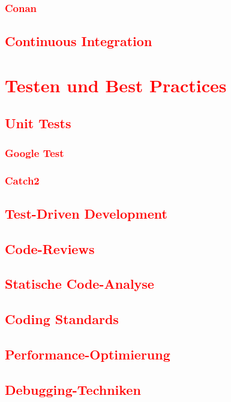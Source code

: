 \subsection{\textcolor{red}{Conan}}\label{sec:conan}
\section{\textcolor{red}{Continuous Integration}}\label{sec:continuous-integration}

\cleardoublepage\chapter{\textcolor{red}{Testen und Best Practices}}\label{chap:testing}
\section{\textcolor{red}{Unit Tests}}\label{sec:unit-tests}
\subsection{\textcolor{red}{Google Test}}\label{sec:google-test}
\subsection{\textcolor{red}{Catch2}}\label{sec:catch2}
\section{\textcolor{red}{Test-Driven Development}}\label{sec:tdd}
\section{\textcolor{red}{Code-Reviews}}\label{sec:code-reviews}
\section{\textcolor{red}{Statische Code-Analyse}}\label{sec:static-code-analysis}
\section{\textcolor{red}{Coding Standards}}\label{sec:coding-standards}
\section{\textcolor{red}{Performance-Optimierung}}\label{sec:performance-optimization}
\section{\textcolor{red}{Debugging-Techniken}}\label{sec:debugging-techniques}

